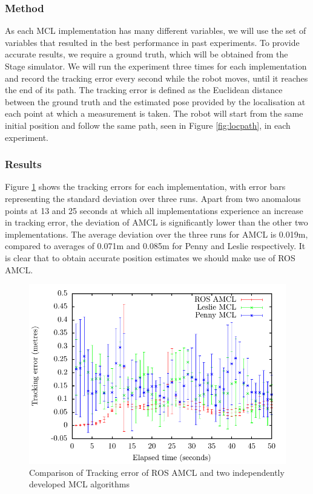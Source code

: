 \documentclass[conference]{IEEEtran}
\begin{document}
\subsubsection{Method}
As each MCL implementation has many different variables, we will use the set of variables that resulted in the best performance in past experiments. To provide accurate results, we require a ground truth, which will be obtained from the Stage simulator. We will run the experiment three times for each implementation and record the tracking error every second while the robot moves, until it reaches the end of its path. The tracking error is defined as the Euclidean distance between the ground truth and the estimated pose provided by the localisation at each point at which a measurement is taken. The robot will start from the same initial position and follow the same path, seen in Figure \ref{fig:locpath}, in each experiment.
\subsubsection{Results}
Figure \ref{fig:local} shows the tracking errors for each implementation, with error bars representing the standard deviation over three runs. Apart from two anomalous points at 13 and 25 seconds at which all implementations experience an increase in tracking error, the deviation of AMCL is significantly lower than the other two implementations. The average deviation over the three runs for AMCL is 0.019m, compared to averages of 0.071m and 0.085m for Penny and Leslie respectively. It is clear that to obtain accurate position estimates we should make use of ROS AMCL.
\begin{figure}
  \includegraphics[width=\columnwidth]{tracking_stdev}
  \caption{Comparison of Tracking error of ROS AMCL and two independently developed MCL algorithms}
  \label{fig:local}
\end{figure}
\end{document}

